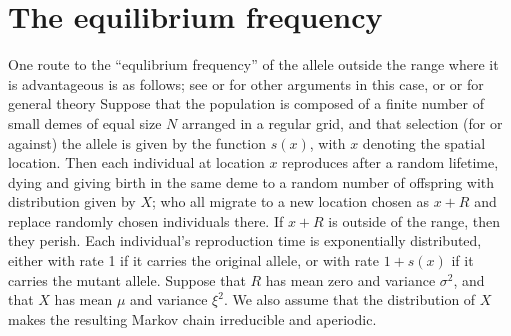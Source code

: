 \documentclass{article}
\begin{document}
\section{The equilibrium frequency}

One route to the ``equlibrium frequency'' of the allele outside the range where it is advantageous is as follows;
see \citet{slatkin} or \citet{barton,pollack} for other arguments in this case, or \citet{etheridge} or \citet{dawson} for general theory
Suppose that the population is composed of a finite number of small demes of equal size $N$ arranged in a regular grid,
and that selection (for or against) the allele is given by the function $s(x)$, with $x$ denoting the spatial location.
Then each individual at location $x$ reproduces after a random lifetime,
dying and giving birth in the same deme to a random number of offspring with distribution given by $X$;
who all migrate to a new location chosen as $x+R$
and replace randomly chosen individuals there.
If $x+R$ is outside of the range, then they perish.
Each individual's reproduction time is exponentially distributed, 
either with rate 1 if it carries the original allele, or with rate $1+s(x)$ if it carries the mutant allele.
Suppose that $R$ has mean zero and variance $\sigma^2$, and that $X$ has mean $\mu$ and variance $\xi^2$.
We also assume that the distribution of $X$ makes the resulting Markov chain irreducible and aperiodic.
\end{document}
